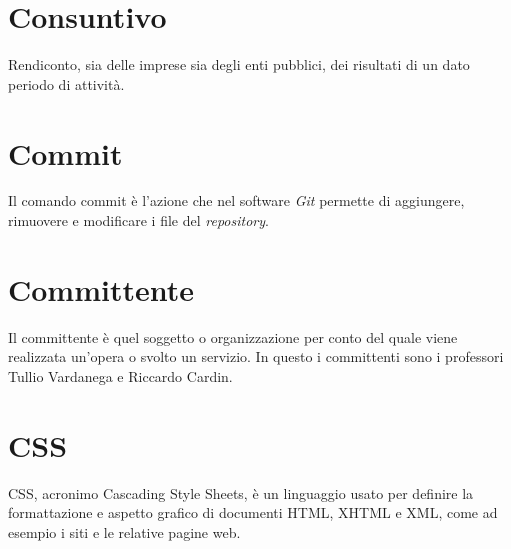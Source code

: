 \section{Consuntivo}
Rendiconto, sia delle imprese sia degli enti pubblici, dei risultati di un dato periodo di attività.

\section{Commit}
Il comando commit è l'azione che nel software \emph{Git} permette di aggiungere, rimuovere e modificare i file del \emph{repository}.

\section{Committente}
Il committente è quel soggetto o organizzazione per conto del quale viene realizzata un'opera o svolto un servizio. In questo  i committenti sono i professori Tullio Vardanega e Riccardo Cardin.

\section{CSS}
CSS, acronimo Cascading Style Sheets, è un linguaggio usato per definire la formattazione e aspetto grafico di documenti HTML, XHTML e XML, come ad esempio i siti e le relative pagine web.